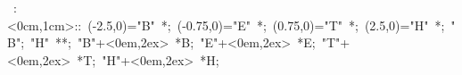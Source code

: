 \hbox{
\xy    <1cm,0cm>:<0cm,1cm>::
       (-2.5,0)="B" *{\bullet}; (-0.75,0)="E" *{\bullet}; 
       (0.75,0)="T" *{\bullet}; (2.5,0)="H" *{\bullet};  
       "B"; "H" **\dir{-};
       "B"+<0em,2ex> *{B};
       "E"+<0em,2ex> *{E};
       "T"+<0em,2ex> *{T};
       "H"+<0em,2ex> *{H};
       \endxy}
